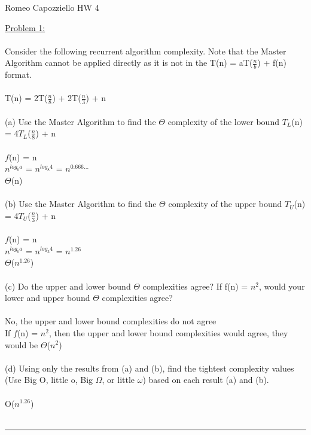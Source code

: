 \documentclass{article}
\begin{document}
    \begin{center}
        Romeo Capozziello HW 4
    \end{center}
    \underline{Problem 1:}\\\\
    Consider the following recurrent algorithm complexity. Note that the Master Algorithm cannot be applied directly as it is not in the T(n) = aT($\frac{n}{b}$) + f(n) format.\\
    \\
    \indent T(n) = 2T($\frac{n}{8}$) + 2T($\frac{n}{3}$) + n\\
    \\
    (a) Use the Master Algorithm to find the $\Theta$ complexity of the lower bound $T_L$(n) = 4$T_L$($\frac{n}{8}$) + n\\
    \\
    \indent $f$(n) = n\\
    \indent $n^{log_b a}$ = $n^{log_8 4}$ = $n^{0.666...}$\\
    \indent $\Theta$(n)\\
    \\
    (b) Use the Master Algorithm to find the $\Theta$ complexity of the upper bound $T_U$(n) = 4$T_U$($\frac{n}{3}$) + n\\
    \\
    \indent $f$(n) = n\\
    \indent $n^{log_b a}$ = $n^{log_3 4}$ = $n^{1.26}$\\
    \indent $\Theta$($n^{1.26}$)\\
    \\
    (c) Do the upper and lower bound $\Theta$ complexities agree? If f(n) = $n^2$, would your lower and upper bound $\Theta$ complexities agree?\\
    \\
    \indent No, the upper and lower bound complexities do not agree\\
    \indent If $f$(n) = $n^2$, then the upper and lower bound complexities would agree, they would be $\Theta$($n^2$)\\
    \\
    (d) Using only the results from (a) and (b), find the tightest complexity values (Use Big O, little o, Big $\Omega$, or little $\omega$) based on each result (a) and (b).\\
    \\
    \indent O($n^{1.26}$)\\
    \\
    \rule{\textwidth}{0.5pt}\\
\end{document}
